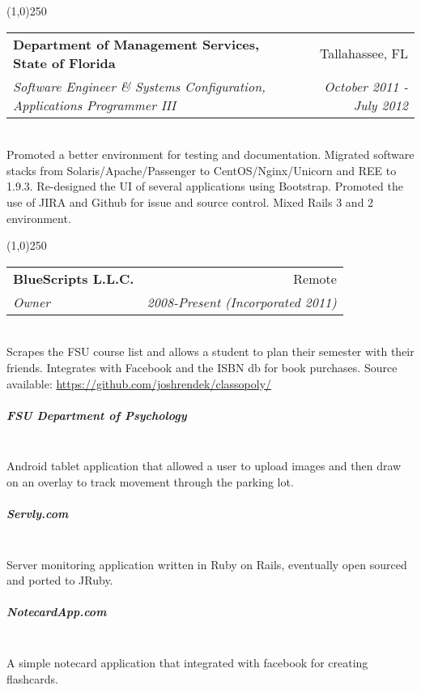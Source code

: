 \documentclass[a4paper,11pt,sans]{article}
\makeatletter
\newcommand{\ressubheading}[4]{
\begin{tabular*}{7.0in}{l@{\extracolsep{\fill}}r}
		\textbf{#1} & #2 \\
		\textit{#3} & \textit{#4} \\
\end{tabular*}\vspace{-6pt}}
\makeatother
\begin{document}
\begin{center}
  \line(1,0){250}
\end{center}


\ressubheading{Department of Management Services, State of Florida}{Tallahassee, FL}{Software Engineer \& Systems Configuration, Applications Programmer III}{October 2011 - July 2012}

\hspace{5pt} \\

Promoted a better environment for testing and documentation. Migrated software stacks from Solaris/Apache/Passenger to CentOS/Nginx/Unicorn and REE to 1.9.3.
Re-designed the UI of several applications using Bootstrap. Promoted the use of JIRA and Github for issue and source control. Mixed Rails 3 and 2 environment.

\begin{center}
  \line(1,0){250}
\end{center}

\ressubheading{BlueScripts L.L.C.}{Remote}{Owner}{2008-Present (Incorporated 2011)}

\setlength{\parindent}{15pt}

\hspace{5pt} \\

Scrapes the FSU course list and allows a student to plan their semester with their friends. Integrates with Facebook and the ISBN db for book purchases.
Source available: \url{https://github.com/joshrendek/classopoly/}

\subparagraph{FSU Department of Psychology} \hspace{5pt} \\

Android tablet application that allowed a user to upload images and then draw on an overlay to track movement through the parking lot.

\subparagraph{Servly.com} \hspace{5pt} \\

Server monitoring application written in Ruby on Rails, eventually open sourced and ported to JRuby.

\subparagraph{NotecardApp.com} \hspace{5pt} \\

A simple notecard application that integrated with facebook for creating flashcards.
\end{document}
